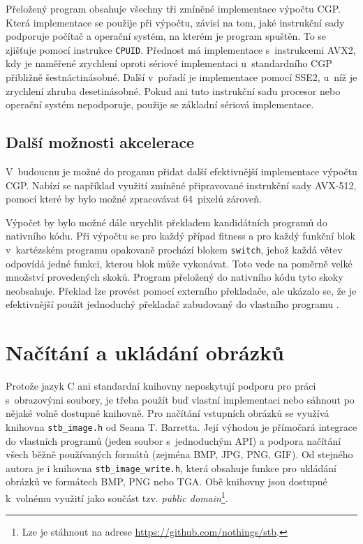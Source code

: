 Přeložený program obsahuje všechny tři zmíněné implementace výpočtu CGP. Která implementace se použije při výpočtu, závisí na tom, jaké instrukční sady podporuje počítač a operační systém, na kterém je program spuštěn. To se zjišťuje pomocí instrukce \texttt{CPUID}. Přednost má implementace s~instrukcemi AVX2, kdy je naměřené zrychlení oproti sériové implementaci u~standardního CGP přibližně šestnáctinásobné. Další v~pořadí je implementace pomocí SSE2, u~níž je zrychlení zhruba desetinásobné. Pokud ani tuto instrukční sadu procesor nebo operační systém nepodporuje, použije se základní sériová implementace.

\subsection{Další možnosti akcelerace}

V~budoucnu je možné do progamu přidat další efektivnější implementace výpočtu CGP. Nabízí se například využití zmíněné připravované instrukční sady AVX-512, pomocí které by bylo možné zpracovávat 64~pixelů zároveň.

Výpočet by bylo možné dále urychlit překladem kandidátních programů do nativního kódu. Při výpočtu se pro každý případ fitness a pro každý funkční blok v~kartézském programu opakovaně prochází blokem \texttt{switch}, jehož každá větev odpovídá jedné funkci, kterou blok může vykonávat. Toto vede na poměrně velké množství provedených skoků.
Program přeložený do nativního kódu tyto skoky neobsahuje. Překlad lze provést pomocí externího překladače, ale ukázalo se, že je efektivnější použít jednoduchý překladač zabudovaný do vlastního programu \cite{VasicekCompiler}.

\section{Načítání a ukládání obrázků}
\label{secImplImages}

Protože jazyk C ani standardní knihovny neposkytují podporu pro práci s~obrazovými soubory, je třeba použít buď vlastní implementaci nebo sáhnout po nějaké volně dostupné knihovně. Pro načítání vstupních obrázků se využívá knihovna \texttt{stb\_image.h} od Seana T. Barretta. Její výhodou je přímočará integrace do vlastních programů (jeden soubor s~jednoduchým API) a podpora načítání všech běžně používaných formátů (zejména BMP, JPG, PNG, GIF). Od stejného autora je i knihovna \texttt{stb\_image\_write.h}, která obsahuje funkce pro ukládání obrázků ve formátech BMP, PNG nebo TGA. Obě knihovny jsou dostupné k~volnému využití jako součást tzv. \emph{public domain}\footnote{Lze je stáhnout na adrese \url{https://github.com/nothings/stb}.}.

